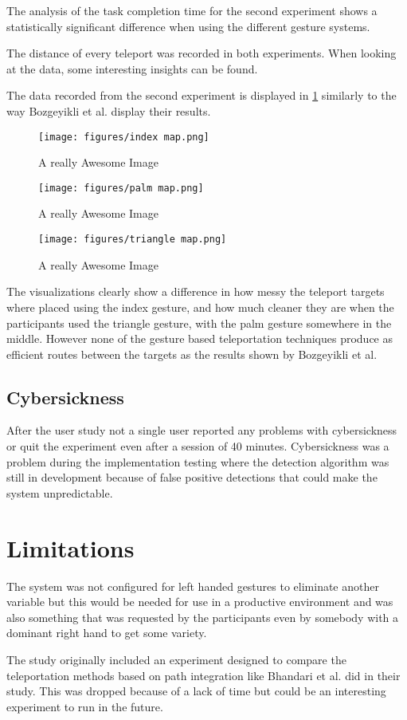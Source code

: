 The analysis of the task completion time for the second experiment shows a statistically significant difference when using the different gesture systems. 

The distance of every teleport was recorded in both experiments. When looking at the data, some interesting insights can be found. %

The data recorded from the second experiment is displayed in \ref{fig:exp2maps} similarly to the way Bozgeyikli et al. %
display their results. 

\begin{figure}[!htb]
        \texttt{[image: figures/index map.png]}
        \caption{A really Awesome Image}\label{fig:map_index}
    \endminipage\hfill
        \texttt{[image: figures/palm map.png]}
        \caption{A really Awesome Image}\label{fig:map_palm}
    \endminipage\hfill
        \texttt{[image: figures/triangle map.png]}
        \caption{A really Awesome Image}\label{fig:map_triangle}
        \label{fig:exp2maps}
    \endminipage
\end{figure}
    
The visualizations clearly show a difference in how messy the teleport targets where placed using the index gesture, and how much cleaner they are when the participants used the triangle gesture, with the palm gesture somewhere in the middle. However none of the gesture based teleportation techniques produce as efficient routes between the targets as the results shown by Bozgeyikli et al.



\subsection{Cybersickness}
After the user study not a single user reported any problems with cybersickness or quit the experiment even after a session of 40 minutes. Cybersickness was a problem during the implementation testing where the detection algorithm was still in development because of false positive detections that could make the system unpredictable.

\section{Limitations}
The system was not configured for left handed gestures to eliminate another variable but this would be needed for use in a productive environment and was also something that was requested by the participants even by somebody with a dominant right hand to get some variety. 

The study originally included an experiment designed to compare the teleportation methods based on path integration like Bhandari et al. \cite{Bhandari} did in their study. This was dropped because of a lack of time but could be an interesting experiment to run in the future.
